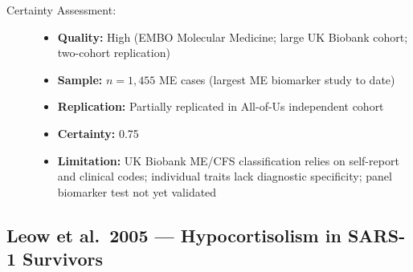 \begin{description}
    \item[Certainty Assessment:]
    \begin{itemize}
        \item \textbf{Quality:} High (EMBO Molecular Medicine; large UK Biobank cohort; two-cohort replication)
        \item \textbf{Sample:} $n=1{,}455$ ME cases (largest ME biomarker study to date)
        \item \textbf{Replication:} Partially replicated in All-of-Us independent cohort
        \item \textbf{Certainty:} 0.75
        \item \textbf{Limitation:} UK Biobank ME/CFS classification relies on self-report and clinical codes; individual traits lack diagnostic specificity; panel biomarker test not yet validated
    \end{itemize}
\end{description}


\subsection{Leow et al.\ 2005 --- Hypocortisolism in SARS-1 Survivors}

